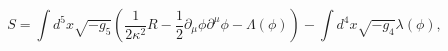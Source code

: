 \begin{equation}
S = \int d^{5}x \sqrt{- g_{5}} \left( \frac{1}{2 \kappa^{2}} R 
- \frac{1}{2} \partial_{\mu} \phi \partial^{\mu} \phi - \Lambda(\phi) \right)
- \int d^{4}x \sqrt{- g_{4}} \lambda(\phi),
\end{equation}

